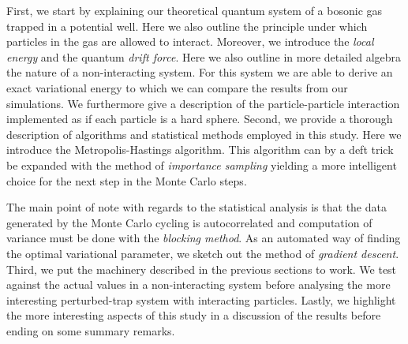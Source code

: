 \documentclass[
    a4paper, aps, twocolumn, floatfix, superscriptaddress,
    nofootinbib]{revtex4-1}
\newcommand{\1}{\mathds{1}}
\begin{document}
    First, we start by explaining our theoretical quantum system of a bosonic
    gas trapped in a potential well. Here we also outline the principle under
    which particles in the gas are allowed to interact. Moreover, we introduce
    the \emph{local energy} and the quantum \emph{drift force}. Here we also
    outline in more detailed algebra the nature of a non-interacting system. For
    this system we are able to derive an exact variational energy to which we
    can compare the results from our simulations. We furthermore give a
    description of the particle-particle interaction implemented as if each
    particle is a hard sphere. Second, we provide a thorough description of
    algorithms and statistical methods employed in this study. Here we introduce
    the Metropolis-Hastings algorithm. This algorithm can by a deft trick be
    expanded with the method of \emph{importance sampling} yielding a more
    intelligent choice for the next step in the Monte Carlo steps.

    The main point of note with regards to the statistical analysis is that the
    data generated by the Monte Carlo cycling is autocorrelated and computation
    of variance must be done with the \emph{blocking method}.  As an automated
    way of finding the optimal variational parameter, we sketch out the method
    of \emph{gradient descent}.  Third, we put the machinery described in the
    previous sections to work. We test against the actual values in a
    non-interacting system before analysing the more interesting perturbed-trap
    system with interacting particles.  Lastly, we highlight the more
    interesting aspects of this study in a discussion of the results before
    ending on some summary remarks.
\end{document}
